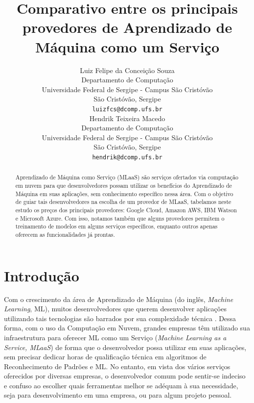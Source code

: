 \documentclass{article}
\title{Comparativo entre os principais provedores de Aprendizado de Máquina como um Serviço}
\author{
  Luiz Felipe da Conceição Souza \\
  Departamento de Computação\\
  Universidade Federal de Sergipe - Campus São Cristóvão\\
  São Cristóvão, Sergipe \\
  \texttt{luizfcs@dcomp.ufs.br} \\
   \And
 Hendrik Teixeira Macedo \\
  Departamento de Computação\\
 Universidade Federal de Sergipe - Campus São Cristóvão\\
  São Cristóvão, Sergipe \\
  \texttt{hendrik@dcomp.ufs.br} \\
}
\begin{document}
\maketitle

\begin{abstract}
Aprendizado de Máquina como Serviço (MLaaS) são serviços ofertados via computação em nuvem para que desenvolvedores possam utilizar os benefícios do Aprendizado de Máquina em suas aplicações, sem conhecimento específico nessa área. Com o objetivo de guiar tais desenvolvedores na escolha de um provedor de MLaaS, tabelamos neste estudo os preços dos principais provedores: Google Cloud, Amazon AWS, IBM Watson e Microsoft Azure. Com isso, notamos também que alguns provedores permitem o treinamento de modelos em alguns serviços específicos, enquanto outros apenas oferecem as funcionalidades já prontas.
\end{abstract}


\section{Introdução}
Com o crescimento da área de Aprendizado de Máquina (do inglês, \textit{Machine Learning}, ML)\cite{alpaydin2014introduction}, muitos desenvolvedores que querem desenvolver aplicações utilizando tais tecnologias são barrados por sua complexidade técnica \cite{ribeiro2015}. Dessa forma, com o uso da Computação em Nuvem, grandes empresas têm utilizado sua infraestrutura para oferecer ML como um Serviço (\textit{Machine Learning as a Service, MLaaS}) de forma que o desenvolvedor possa utilizar em suas aplicações, sem precisar dedicar horas de qualificação técnica em algoritmos de Reconhecimento de Padrões e ML. No entanto, em vista dos vários serviços oferecidos por diversas empresas, o desenvolvedor comum pode sentir-se indeciso e confuso ao escolher quais ferramentas melhor se adéquam à sua necessidade, seja para desenvolvimento em uma empresa, ou para algum projeto pessoal.
\end{document}
